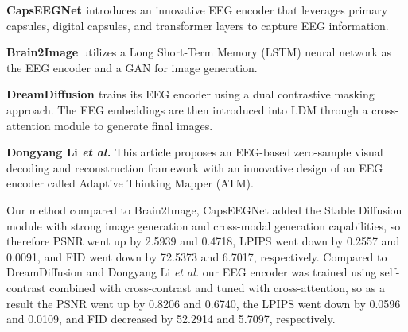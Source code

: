 \documentclass[conference]{IEEEtran}
\begin{document}
\begin{table}[htbp]
    \scriptsize
    \centering
    \caption{Performance Comparisons of the images generated by each model.}
    \label{tab:Comparison_experiment_table}
\end{table}

\noindent\textbf{CapsEEGNet \cite{b28}} introduces an innovative EEG encoder that leverages primary capsules, digital capsules, and transformer layers to capture EEG information. \ 

\noindent\textbf{Brain2Image \cite{b3}} utilizes a Long Short-Term Memory (LSTM) \cite{b34} neural network as the EEG encoder and a GAN \cite{b35} for image generation.\ 

\noindent\textbf{DreamDiffusion \cite{b2}} trains its EEG encoder using a dual contrastive masking approach. The EEG embeddings are then introduced into LDM through a cross-attention module to generate final images.

\noindent\textbf{Dongyang Li \textit{et al.} \cite{b29}} This article proposes an EEG-based zero-sample visual decoding and reconstruction framework with an innovative design of an EEG encoder called Adaptive Thinking Mapper (ATM).\ 


Our method compared to Brain2Image, CapsEEGNet added the Stable Diffusion module with strong image generation and cross-modal generation capabilities, so therefore PSNR went up by 2.5939 and 0.4718, LPIPS went down by 0.2557 and 0.0091, and FID went down by 72.5373 and 6.7017, respectively. Compared to DreamDiffusion and Dongyang Li \textit{et al.} our EEG encoder was trained using self-contrast combined with cross-contrast and tuned with cross-attention, so as a result the PSNR went up by 0.8206 and 0.6740, the LPIPS went down by 0.0596 and 0.0109, and FID decreased by 52.2914 and 5.7097, respectively.
\end{document}
